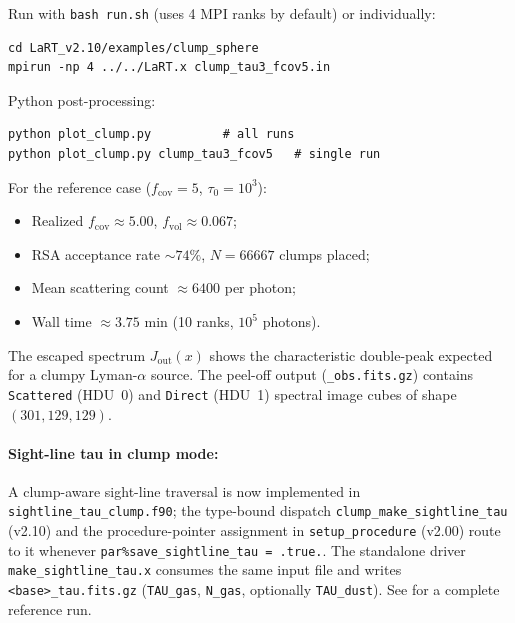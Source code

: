\documentclass[english,a4paper]{my_memo}
\begin{document}
Run with \texttt{bash run.sh} (uses 4 MPI ranks by default) or individually:
\begin{verbatim}
cd LaRT_v2.10/examples/clump_sphere
mpirun -np 4 ../../LaRT.x clump_tau3_fcov5.in
\end{verbatim}
Python post-processing:
\begin{verbatim}
python plot_clump.py          # all runs
python plot_clump.py clump_tau3_fcov5   # single run
\end{verbatim}

For the reference case ($f_\mathrm{cov}=5$, $\tau_0=10^3$):
\begin{itemize}
  \item Realized $f_\mathrm{cov} \approx 5.00$, $f_\mathrm{vol} \approx 0.067$;
  \item RSA acceptance rate $\sim 74\%$, $N=66667$ clumps placed;
  \item Mean scattering count $\approx 6400$ per photon;
  \item Wall time $\approx 3.75$ min (10 ranks, $10^5$ photons).
\end{itemize}

The escaped spectrum $J_\mathrm{out}(x)$ shows the characteristic double-peak
expected for a clumpy Lyman-$\alpha$ source.  The peel-off output
(\texttt{\_obs.fits.gz}) contains \texttt{Scattered} (HDU~0) and
\texttt{Direct} (HDU~1) spectral image cubes of shape $(301, 129, 129)$.

\begin{sloppypar}
\paragraph{Sight-line tau in clump mode:}
A clump-aware sight-line traversal is now implemented in
\texttt{sightline\_tau\_clump.f90}; the type-bound dispatch
\texttt{clump\_make\_sightline\_tau} (v2.10) and the procedure-pointer
assignment in \texttt{setup\_procedure} (v2.00) route to it whenever
\texttt{par\%save\_sightline\_tau = .true.}.  The standalone driver
\texttt{make\_sightline\_tau.x} consumes the same input file and writes
\texttt{<base>\_tau.fits.gz} (\texttt{TAU\_gas}, \texttt{N\_gas},
optionally \texttt{TAU\_dust}).  See
 for a complete
reference run.
\end{sloppypar}
\end{document}
